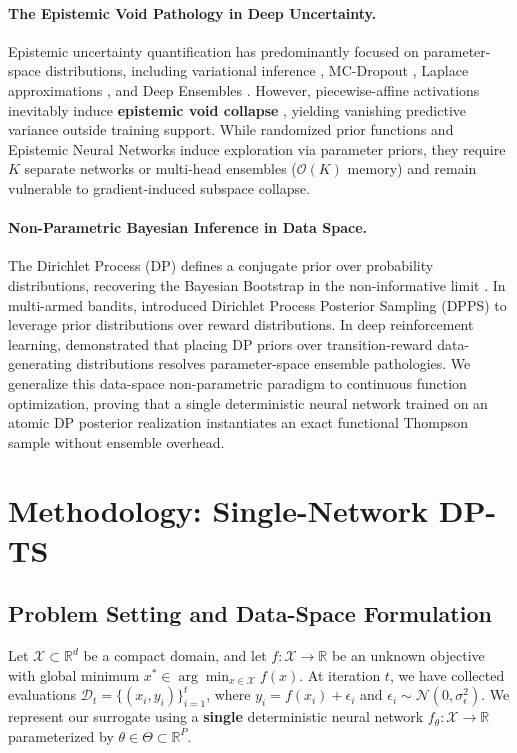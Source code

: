 \documentclass{article}
\begin{document}
\paragraph{The Epistemic Void Pathology in Deep Uncertainty.}
Epistemic uncertainty quantification has predominantly focused on parameter-space distributions, including variational inference \citep{blundell2015weight}, MC-Dropout \citep{gal2016dropout}, Laplace approximations \citep{daxberger2021laplace}, and Deep Ensembles \citep{lakshminarayanan2017simple}. However, piecewise-affine activations inevitably induce \textbf{epistemic void collapse} \citep{foong2019inbetween,hein2019why,ober2021promises}, yielding vanishing predictive variance outside training support. While randomized prior functions \citep{osband2018randomized} and Epistemic Neural Networks \citep{osband2021epistemic} induce exploration via parameter priors, they require $K$ separate networks or multi-head ensembles ($\mathcal{O}(K)$ memory) and remain vulnerable to gradient-induced subspace collapse.

\paragraph{Non-Parametric Bayesian Inference in Data Space.}
The Dirichlet Process (DP) \citep{ferguson1973bayesian} defines a conjugate prior over probability distributions, recovering the Bayesian Bootstrap in the non-informative limit \citep{rubin1981bayesian}. In multi-armed bandits, \citet{vashishtha2025leveraging} introduced Dirichlet Process Posterior Sampling (DPPS) to leverage prior distributions over reward distributions. In deep reinforcement learning, \citet{vashishtha2025tmlr,vashishtha2026thesis} demonstrated that placing DP priors over transition-reward data-generating distributions resolves parameter-space ensemble pathologies. We generalize this data-space non-parametric paradigm to continuous function optimization, proving that a single deterministic neural network trained on an atomic DP posterior realization instantiates an exact functional Thompson sample without ensemble overhead.

\section{Methodology: Single-Network DP-TS}
\label{sec:method}

\subsection{Problem Setting and Data-Space Formulation}
Let $\mathcal{X} \subset \mathbb{R}^d$ be a compact domain, and let $f: \mathcal{X} \to \mathbb{R}$ be an unknown objective with global minimum $x^* \in \arg\min_{x \in \mathcal{X}} f(x)$. At iteration $t$, we have collected evaluations $\mathcal{D}_t = \{(x_i, y_i)\}_{i=1}^t$, where $y_i = f(x_i) + \epsilon_i$ and $\epsilon_i \sim \mathcal{N}(0, \sigma_{\epsilon}^2)$. We represent our surrogate using a \textbf{single} deterministic neural network $f_\theta: \mathcal{X} \to \mathbb{R}$ parameterized by $\theta \in \Theta \subset \mathbb{R}^P$.
\end{document}
